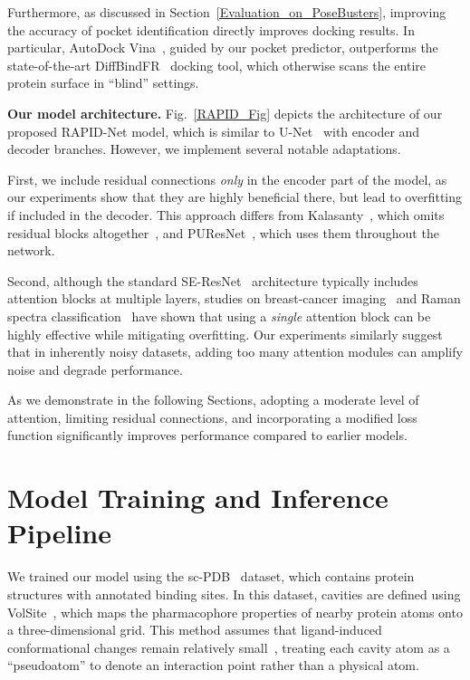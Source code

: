 \documentclass[10pt,conference]{IEEEtran}
\begin{document}
Furthermore, as discussed in Section~\ref{Evaluation_on_PoseBusters}, improving the accuracy of pocket identification directly improves docking results. In particular, AutoDock Vina~\cite{eberhardt2021autodock}, guided by our pocket predictor, outperforms the state-of-the-art DiffBindFR~\cite{zhu2024diffbindfr} docking tool, which otherwise scans the entire protein surface in ``blind'' settings.




\vspace{1em}
\noindent
\textbf{Our model architecture.}
Fig.~\ref{RAPID_Fig} depicts the architecture of our proposed RAPID-Net model, which is similar to U-Net~\cite{ronneberger2015u} with encoder and decoder branches. However, we implement several notable adaptations. 

First, we include residual connections \textit{only} in the encoder part of the model, as our experiments show that they are highly beneficial there, but lead to overfitting if included in the decoder. This approach differs from Kalasanty~\cite{stepniewska2020improving}, which omits residual blocks altogether~\cite{he2016deep}, and PUResNet~\cite{kandel2021puresnet}, which uses them throughout the network.

Second, although the standard SE-ResNet~\cite{hu2018squeeze} architecture typically includes attention blocks at multiple layers, studies on breast-cancer imaging~\cite{jiang2019breast} and Raman spectra classification~\cite{balytskyi2024enhancing} have shown that using a \textit{single} attention block can be highly effective while mitigating overfitting. Our experiments similarly suggest that in inherently noisy datasets, adding too many attention modules can amplify noise and degrade performance.

As we demonstrate in the following Sections, adopting a moderate level of attention, limiting residual connections, and incorporating a modified loss function significantly improves performance compared to earlier models.


\section{Model Training and Inference Pipeline}
\label{Training_pipeline}

We trained our model using the sc-PDB~\cite{desaphy2015scpdb} dataset, which contains protein structures with annotated binding sites. In this dataset, cavities are defined using VolSite~\cite{desaphy2012comparison}, which maps the pharmacophore properties of nearby protein atoms onto a three-dimensional grid. This method assumes that ligand-induced conformational changes remain relatively small~\cite{kellenberger2008similarity}, treating each cavity atom as a ``pseudoatom'' to denote an interaction point rather than a physical atom.
\end{document}
